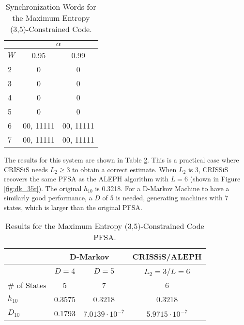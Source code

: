 {\begin{table}
\centering
\caption{Synchronization Words for the Maximum Entropy (3,5)-Constrained Code. \label{tab:dk35synch}}
\begin{tabular}{|l|c|c|}
\hline
 & \multicolumn{2}{c|}{\textbf{$\alpha$}}\\
 \hline
$W$ & 0.95 & 0.99 \\
\hline
2 & 0 & 0 \\ 
3 & 0 & 0 \\ 
4 & 0 & 0 \\ 
5 & 0  & 0 \\
6 & 00, 11111  & 00, 11111 \\
7 & 00, 11111  & 00, 11111 \\
 \hline
\end{tabular}
\end{table}

The results for this system are shown in Table \ref{tab:dk35}. This is a practical case where CRISSiS needs $L_2 \geq 3$ to obtain a correct estimate. When $L_2$ is 3, CRISSiS recovers the same PFSA as the ALEPH algorithm with $L=6$ (shown in Figure \ref{fig:dk_35r}). The original $h_{10}$ is 0.3218. For a D-Markov Machine to have a similarly good performance, a $D$ of 5 is needed, generating machines with 7 states, which is larger than the original PFSA.

\begin{table}
\centering
\caption{Results for the Maximum Entropy (3,5)-Constrained Code PFSA. \label{tab:dk35}}
\begin{tabular}{|l|c|c|c|}
\hline
 & \multicolumn{2}{c|}{D-Markov} & CRISSiS/ALEPH \\
 \hline
 & $D=4$ & $D=5$ & $L_2=3$/$L=6$\\
\hline
\# of States & 5 & 7 & 6 \\ 
$h_{10}$ & 0.3575 & 0.3218 &  0.3218 \\
$D_{10}$ & 0.1793 & $7.0139\cdot 10^{-7}$ & $5.9715\cdot 10^{-7}$\\
 \hline
\end{tabular}
\end{table}

}
